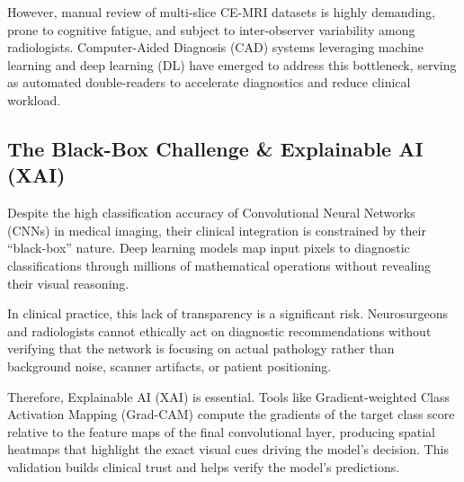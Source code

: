 \documentclass[journal,twoside]{IEEEtran}
\begin{document}
However, manual review of multi-slice CE-MRI datasets is highly demanding, prone to cognitive fatigue, and subject to inter-observer variability among radiologists. Computer-Aided Diagnosis (CAD) systems leveraging machine learning and deep learning (DL) have emerged to address this bottleneck, serving as automated double-readers to accelerate diagnostics and reduce clinical workload.

\subsection{The Black-Box Challenge \& Explainable AI (XAI)}
Despite the high classification accuracy of Convolutional Neural Networks (CNNs) in medical imaging, their clinical integration is constrained by their ``black-box'' nature. Deep learning models map input pixels to diagnostic classifications through millions of mathematical operations without revealing their visual reasoning.

In clinical practice, this lack of transparency is a significant risk. Neurosurgeons and radiologists cannot ethically act on diagnostic recommendations without verifying that the network is focusing on actual pathology rather than background noise, scanner artifacts, or patient positioning.

Therefore, Explainable AI (XAI) is essential. Tools like Gradient-weighted Class Activation Mapping (Grad-CAM) compute the gradients of the target class score relative to the feature maps of the final convolutional layer, producing spatial heatmaps that highlight the exact visual cues driving the model's decision. This validation builds clinical trust and helps verify the model's predictions.
\end{document}
